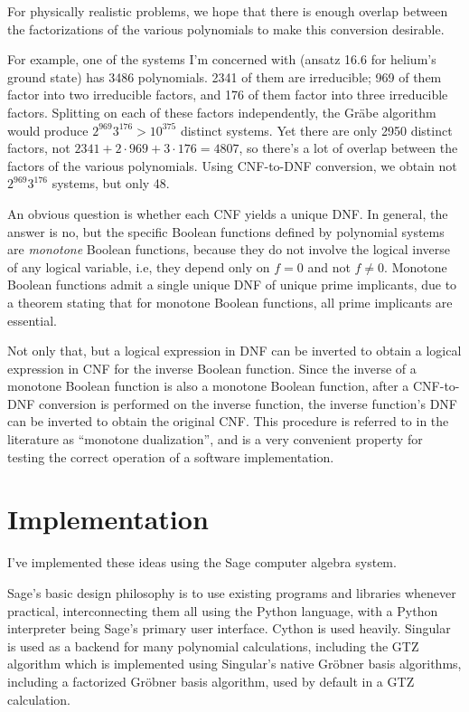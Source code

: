 \documentclass{article}
\begin{document}
For physically realistic problems, we hope that there is enough overlap between
the factorizations of the various polynomials to make this conversion desirable.

For example, one of the systems I'm concerned with (ansatz 16.6 for helium's ground state)
has 3486 polynomials.  2341 of them are irreducible; 969 of them factor into two irreducible factors, and 176 of them
factor into three irreducible factors.  Splitting on each of these factors independently,
the Gr\"abe algorithm would produce $2^{969} 3^{176} > 10^{375}$
distinct systems.  Yet there are only 2950 distinct factors, not $2341+2\cdot969+3\cdot176=4807$,
so there's a lot of overlap between the factors of the various polynomials.
Using CNF-to-DNF conversion, we obtain not $2^{969} 3^{176}$ systems, but only 48.

An obvious question is whether each CNF yields a unique DNF.  In general, the
answer is no, but the specific Boolean functions defined by polynomial systems are {\it monotone} Boolean functions,
because they do not involve the logical inverse of any logical variable, i.e,
they depend only on $f=0$ and not $f\ne 0$.  Monotone Boolean functions admit
a single unique DNF of unique prime implicants, due to a theorem stating that for monotone Boolean functions,
all prime implicants are essential.

Not only that, but a logical expression in DNF can be inverted to obtain a logical expression in CNF
for the inverse Boolean function.  Since the inverse of a monotone Boolean function is also
a monotone Boolean function, after a CNF-to-DNF conversion is performed on the inverse function,
the inverse function's DNF can be inverted to obtain the original CNF.  This procedure
is referred to in the literature as ``monotone dualization'', and is a very convenient
property for testing the correct operation of a software implementation.

\section*{Implementation}

I've implemented these ideas using the Sage computer algebra system.

Sage's basic design philosophy is to use existing programs and libraries
whenever practical, interconnecting them all using the Python language,
with a Python interpreter being Sage's primary user interface.
Cython is used heavily.
Singular is used as a backend for many polynomial calculations,
including the GTZ algorithm which is implemented using Singular's
native Gr\"obner basis algorithms, including a factorized
Gr\"obner basis algorithm, used by default in a GTZ calculation.
\end{document}

